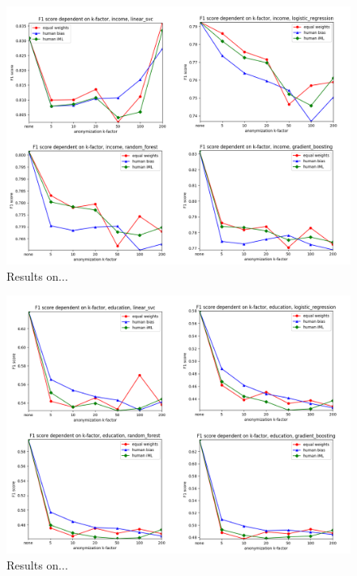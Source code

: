 \documentclass{llncs}
\begin{document}
\begin{figure}[!h]
	\begin{center}
		\vspace{-1.0cm}
		\hspace*{-0.8cm}
		\includegraphics[width=1.0\textwidth]{figures/income.png}
		\caption{Results on...}
		\label{fig:results_income}
	\end{center}
\end{figure}

\begin{figure}[!h]
	\begin{center}
		\vspace{-1.0cm}
		\hspace*{-0.8cm}
		\includegraphics[width=1.0\textwidth]{figures/education_num.png}
		\caption{Results on...}
		\label{fig:results_income}
	\end{center}
\end{figure}
\end{document}
